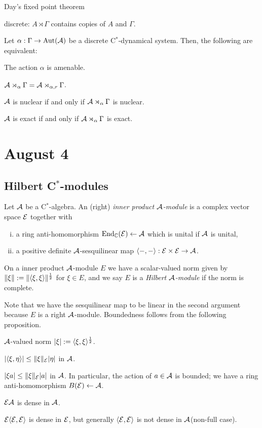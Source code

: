 \documentclass{../../../small}
\begin{document}
Day's fixed point theorem

discrete: $A\rtimes\Gamma$ contains copies of $A$ and $\Gamma$.

\begin{thm}
Let $\alpha:\Gamma\to\operatorname{Aut}(\mathcal{A})$ be a discrete C$^*$-dynamical system.
Then, the following are equivalent:
\begin{parts}
\item The action $\alpha$ is amenable.
\item $\mathcal{A}\rtimes_\alpha\Gamma=\mathcal{A}\rtimes_{\alpha,r}\Gamma$.
\item $\mathcal{A}$ is nuclear if and only if $\mathcal{A}\rtimes_\alpha\Gamma$ is nuclear.
\item $\mathcal{A}$ is exact if and only if $\mathcal{A}\rtimes_\alpha\Gamma$ is exact.
\end{parts}
\end{thm}
\fi


\newpage
\section{August 4}

\subsection{Hilbert C$^*$-modules}

\begin{defn}
Let $\mathcal{A}$ be a C$^*$-algebra.
An (right) \emph{inner product $\mathcal{A}$-module} is a complex vector space $\mathcal{E}$ together with
\begin{enumerate}[(i)]
\item
a ring anti-homomorphism $\operatorname{End}_{\mathbb{C}}(\mathcal{E})\leftarrow\mathcal{A}$ which is unital if $\mathcal{A}$ is unital,
\item
a positive definite $\mathcal{A}$-sesquilinear map $\langle-,-\rangle:\mathcal{E}\times\mathcal{E}\to\mathcal{A}$.
\end{enumerate}
On a inner product $\mathcal{A}$-module $E$ we have a scalar-valued norm given by $\|\xi\|:=\|\langle\xi,\xi\rangle\|^{\frac12}$ for $\xi\in E$, and we say $E$ is a \emph{Hilbert $\mathcal{A}$-module} if the norm is complete.
\end{defn}

Note that we have the sesquilinear map to be linear in the second argument because $E$ is a right $\mathcal{A}$-module.
Boundedness follows from the following proposition.

\begin{prop}
$\mathcal{A}$-valued norm $|\xi|:=\langle\xi,\xi\rangle^{\frac12}$.
\begin{parts}
\item $|\langle\xi,\eta\rangle|\le\|\xi\|_{\mathcal{E}}|\eta|$ in $\mathcal{A}$.
\item $|\xi a|\le\|\xi\|_{\mathcal{E}}|a|$ in $\mathcal{A}$. In particular, the action of $a\in\mathcal{A}$ is bounded; we have a ring anti-homomorphism $B(\mathcal{E})\leftarrow\mathcal{A}$.
\item $\mathcal{E}\mathcal{A}$ is dense in $\mathcal{A}$.
\item $\mathcal{E}\langle\mathcal{E},\mathcal{E}\rangle$ is dense in $\mathcal{E}$, but generally $\langle\mathcal{E},\mathcal{E}\rangle$ is not dense in $\mathcal{A}$(non-full case).
\end{parts}
\end{prop}
\end{document}
